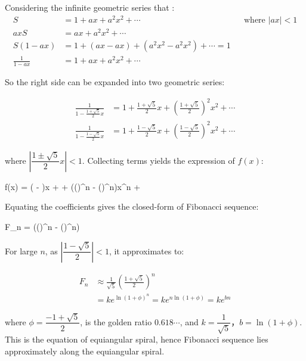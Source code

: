 Considering the infinite geometric series that :
\begin{align*}
S &= 1 + ax + a^2x^2 + \dotsb && \text{where } |ax| < 1 \\
axS &= ax + a^2x^2 + \dotsb \\
S(1 - ax) &= 1 + (ax - ax) + (a^2x^2 - a^2x^2) + \dotsb = 1 \\
\frac{1}{1 - ax} &= 1 + ax + a^2x^2 + \dotsb
\end{align*}

So the right side can be expanded into two geometric series:

\begin{align*}
\frac{1}{1 - \frac{1 + \sqrt{5}}{2}x} &= 1 + \frac{1 + \sqrt{5}}{2}x + (\frac{1 + \sqrt{5}}{2})^2x^2 + \dotsb \\
\frac{1}{1 - \frac{1 - \sqrt{5}}{2}x} &= 1 + \frac{1 - \sqrt{5}}{2}x + (\frac{1 - \sqrt{5}}{2})^2x^2 + \dotsb
\end{align*}

where $|\dfrac{1\pm\sqrt{5}}{2}x| < 1$. Collecting terms yields the expression of $f(x)$:

\be
f(x) = ( - )x + \dotsb + (()^n - ()^n)x^n + \dotsb
\ee

Equating the coefficients gives the closed-form of Fibonacci sequence: 

\be
F_n = (()^n - ()^n)
\ee

For large $n$, as $|\dfrac{1 - \sqrt{5}}{2}| < 1$, it approximates to:

\begin{align*}
F_n &\approx \frac{1}{\sqrt{5}}(\frac{1 + \sqrt{5}}{2})^n \\
  &= ke^{\ln (1 + \phi)^n} = ke^{n\ln(1 + \phi)} = ke^{bn}
\end{align*}

where $\phi = \dfrac{-1 + \sqrt{5}}{2}$, is the golden ratio $0.618\dotsm$, and $k = \dfrac{1}{\sqrt{5}}$，$b = \ln (1 + \phi)$. This is the equation of equiangular spiral, hence Fibonacci sequence lies approximately along the equiangular spiral.
